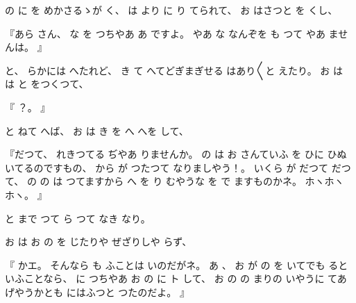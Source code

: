 の
に
を
めかさるゝが
く、
%
は
より
に
り
てられて、
%
お
はさつと
を
くし、

『あら
さん、
%
な
を
つちやあ
あ
ですよ。
%
やあ
な
なんぞを
も
つて
やあ
ませんは。
』

と、
%
らかには
へたれど、
%
き
て
へてどぎまぎせる
はあり〳〵と
えたり。
%
お
は
は
と
をつくつて、

『
？。
』

と
ねて
へば、
%
お
は
き
を
へ
へを
して、

『だつて、
%
れきつてる
ぢやあ
りませんか。
%
の
は
お
さんていふ
を
ひに
ひぬいてるのですもの、
%
から
が
つたつて
なりましやう！。
%
いくら
が
だつて
だつて、
%
の
の
は
つてますから
へ
を
り
むやうな
を
で
ますものかネ。
%
ホヽホヽホヽ。
』

と
まで
つて
ら
つて
なき
なり。

お
は
お
の
を
じたりや
ぜざりしや
らず、

『
かエ。
%
そんなら
も
ふことは
いのだがネ。
%
あ
、
%
お
が
の
を
いてでも
るといふことなら、
%
に
つちやあ
お
の
に
ト
して、
%
お
の
の
まりの
いやうに
てあげやうかとも
にはふつと
つたのだよ。
』

